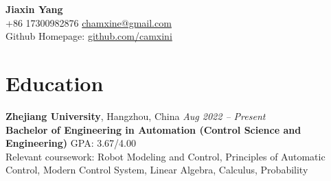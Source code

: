 \documentclass[a4paper,10pt]{article}
\begin{document}
\begin{center}
    {\LARGE \textbf{Jiaxin Yang}}\\
    \vspace{2mm}
    +86 17300982876 \quad \href{mailto:chamxine@gmail.com}{chamxine@gmail.com} \\
    Github Homepage: \href{https://github.com/camxini}{github.com/camxini} \\
\end{center}

\vspace{2mm}

\section*{Education}
\textbf{Zhejiang University}, Hangzhou, China \hfill \textit{Aug 2022 -- Present} \\
\textbf{Bachelor of Engineering in Automation (Control Science and Engineering)} \hfill GPA: 3.67/4.00 \\
Relevant coursework: Robot Modeling and Control, Principles of Automatic Control, Modern Control System, Linear Algebra, Calculus, Probability
\end{document}

